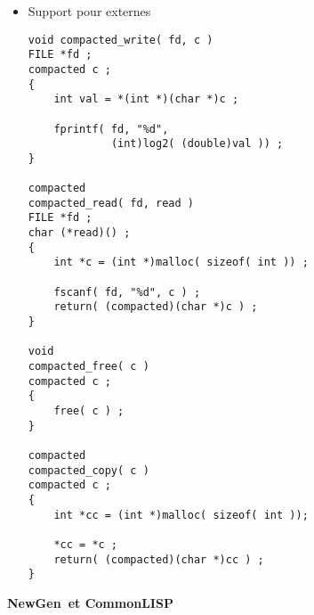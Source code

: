 \documentclass[11pt]{article}
\newcommand{\newgen}{NewGen}
\begin{document}
{\begin{itemize}
\begin{verbatim}
void compacted_write( FILE *, compacted ) ;
compacted compacted_read( FILE *, 
                          char (*)()) ;
void compacted_free( compacted ) ;
compacted compacted_copy( compacted ) ;

main() 
{ 
    gen_read_spec( "identifier.spec", 
                   "expression.spec", 
                   (char*) NULL) ; 
    gen_init_external( COMPACTED, 
                       compacted_read, 
                       compacted_write, 
                       compacted_free,
                       compacted_copy ) ;

    yyparse() ; 
    fprintf( stdout, "%d\n", 
             constant_fold( Top )) ; 

#ifdef DEBUG
    fprintf( stderr,"Bound Identifiers:\n");

    TABULATED_MAP( i, {
        fprintf( stderr, "%s,", 
                 identifier_name( i )) ;
    }, identifier_domain ) ;
#endif

    free_expression( Top ) ;
    gen_free_tabulated(identifier_domain);
}
\end{verbatim}
\item Support pour externes

\begin{verbatim}
void compacted_write( fd, c )
FILE *fd ;
compacted c ;
{
    int val = *(int *)(char *)c ;

    fprintf( fd, "%d", 
             (int)log2( (double)val )) ;
}

compacted
compacted_read( fd, read )
FILE *fd ;
char (*read)() ;
{
    int *c = (int *)malloc( sizeof( int )) ;

    fscanf( fd, "%d", c ) ;
    return( (compacted)(char *)c ) ;
}

void
compacted_free( c )
compacted c ;
{
    free( c ) ;
}

compacted
compacted_copy( c )
compacted c ;
{
    int *cc = (int *)malloc( sizeof( int ));

    *cc = *c ;
    return( (compacted)(char *)cc ) ;
}
\end{verbatim}
\end{itemize}

\newpage

\begin{center}
{\huge\bf \newgen\ et CommonLISP}
\end{center}

\vskip 2cm

}
\end{document}
